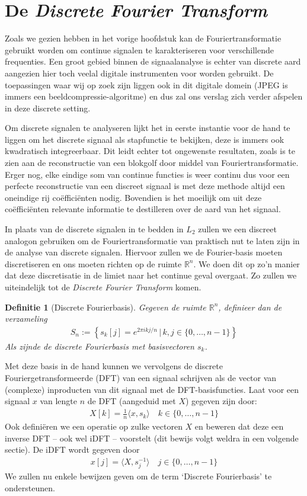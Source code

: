 \documentclass[11pt]{report}
\newcommand{\R}{\mathbb{R}}
\theoremstyle{plain}
\newtheorem*{definitie}{Definitie}
\theoremstyle{remark}
\newcommand{\eq}[1]{\begin{eqnarray*} #1 \end{eqnarray*}}
\newcommand{\coefficient}{co\"effici\"ent}
\newcommand{\largediv}{\,\big|\,}
\newcommand{\Ldnorm}[1]{{||#1||_{L_2}}}
\newcommand{\inpr}[2]{\langle #1 , #2 \rangle}
\newcommand{\dpii}{{2\pi i}}
\begin{document}

\section{De \emph{Discrete Fourier Transform}}
Zoals we gezien hebben in het vorige hoofdstuk kan de Fouriertransformatie gebruikt worden om continue signalen te karakteriseren voor verschillende frequenties. Een groot gebied binnen de signaalanalyse is echter van discrete aard aangezien hier toch veelal digitale instrumenten voor worden gebruikt. De toepassingen waar wij op zoek zijn liggen ook in dit digitale domein (JPEG is immers een beeldcompressie-algoritme) en dus zal ons verslag zich verder afspelen in deze discrete setting.

Om discrete signalen te analyseren lijkt het in eerste instantie voor de hand te liggen om het discrete signaal als stapfunctie te bekijken, deze is immers ook kwadratisch integreerbaar. Dit leidt echter tot ongewenste resultaten, zoals is te zien aan de reconstructie van een blokgolf door middel van Fouriertransformatie. Erger nog, elke eindige som van continue functies is weer continu dus voor een perfecte reconstructie van een discreet signaal is met deze methode altijd een oneindige rij \coefficient en nodig. Bovendien is het moeilijk om uit deze \coefficient en relevante informatie te destilleren over de aard van het signaal.

In plaats van de discrete signalen in te bedden in $L_2$ zullen we een discreet analogon gebruiken om de Fouriertransformatie van praktisch nut te laten zijn in de analyse van discrete signalen. 
Hiervoor zullen we de Fourier-basis moeten discretiseren en ons moeten richten op de ruimte $\R^n$.
We doen dit op zo'n manier dat deze discretisatie in de limiet naar het continue geval overgaat. 
Zo zullen we uiteindelijk tot de \emph{Discrete Fourier Transform} komen.

\begin{definitie}[Discrete Fourierbasis] Gegeven de ruimte $\R^n$, definieer dan de verzameling
\eq{
  S_n := \left\{ s_k [j] = e^{\dpii k j/n } \largediv k,j \in \{0, \ldots, n-1\} \right\}
}
Als zijnde de discrete Fourierbasis met basisvectoren $s_k$.
\end{definitie}
Met deze basis in de hand kunnen we vervolgens de discrete Fouriergetransformeerde (DFT) van een signaal schrijven als de vector van (complexe) inproducten van dit signaal met de DFT-basisfuncties. Laat voor een signaal $x$ van lengte $n$ de DFT (aangeduid met $X$) gegeven zijn door:
\eq{
  X[k] = \tfrac{1}{n} \inpr{x}{s_k} \quad k\in\{0, \ldots ,n-1\}
}
Ook defini\"eren we een operatie op zulke vectoren $X$ en beweren dat deze een inverse DFT -- ook wel iDFT -- voorstelt (dit bewijs volgt weldra in een volgende sectie). De iDFT wordt gegeven door
\eq{
  x[j] = \inpr{X}{s_j^{-1}} \quad j\in \{0, \ldots, n-1\}
}
We zullen nu enkele bewijzen geven om de term `Discrete Fourierbasis' te ondersteunen.
\end{document}
